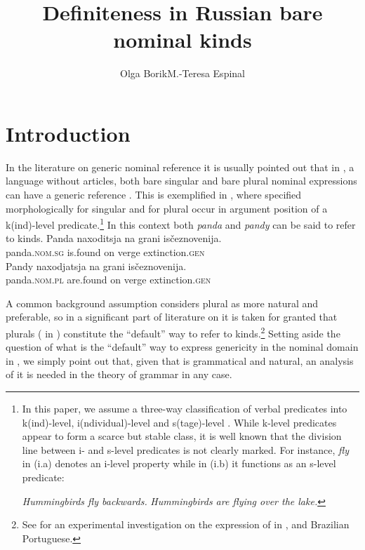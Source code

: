 \documentclass[output=paper
,modfonts
,nonflat]{langsci/langscibook}
\title{Definiteness in Russian bare nominal kinds}
\author{Olga Borik\affiliation{Universidad Nacional de Educación a Distancia}\lastand M.-Teresa Espinal\affiliation{Universitat Autònoma de Barcelona}}
\begin{document}
\maketitle

\section{Introduction} \label{sec:borik:1}
	In the literature on generic nominal reference it is usually pointed out that in , a language without articles, both bare singular and bare plural nominal expressions can have a generic reference \citep{Chierchia1998,Doron2003,Dayal2004}. This is exemplified in , where  specified morphologically for singular  and for plural  occur in argument position of a k(ind)-level predicate.\footnote{In this paper, we assume a three-way classification of verbal predicates into k(ind)-level, i(ndividual)-level and s(tage)-level \citep{Carlson1977}. While k-level predicates appear to form a scarce but stable class, it is well known that the division line between i- and s-level predicates is not clearly marked. For instance, \textit{fly} in (i.a) denotes an i-level property while in (i.b) it functions as an s-level predicate: 
		
	\ea\label{ex:borik:i}
		\ea\label{ex:borik:ia} \textit{Hummingbirds fly backwards.}
		\ex\label{ex:borik:ib} \textit{Hummingbirds are flying over the lake.}
		\z
	\z}
	\newpage
	In this context both \textit{panda} and \textit{pandy} can be said to refer to kinds. 
	\ea\label{ex:borik:1}
	\ea\label{ex:borik:1a}{
		\gll Panda naxoditsja		na		grani			is\v{c}eznovenija.\\ 
		panda.\textsc{nom.sg} is.found on verge extinction.\textsc{gen}\\
	}
	\ex\label{ex:borik:1b}{
		\gll Pandy		naxodjatsja	na	grani	is\v{c}eznovenija. \\
		panda.\textsc{nom.pl} 	are.found 	on	verge	extinction.\textsc{gen}\\
	}
	\z
	\z
	
	A common background assumption considers plural  as more natural and preferable, so in a significant part of literature on  it is taken for granted that plurals ( in ) constitute the ``default'' way to refer to kinds.\footnote{See \citet{Ionin2011} for an experimental investigation on the expression of  in ,  and Brazilian Portuguese.} Setting aside the question of what is the ``default'' way to express genericity in the nominal domain in , we simply point out that, given that  is grammatical and natural, an analysis of it is needed in the theory of grammar in any case.
	
\end{document}

